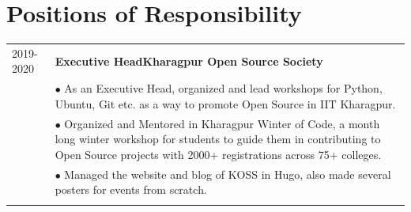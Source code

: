 \documentclass[a4paper,12pt]{extarticle} %
\let\oldtextbf\textbf
\renewcommand{\textbf}[1]{\textcolor{bold}{\oldtextbf{#1}}}
\begin{document}
\vspace{0.5cm}
\section{\textcolor{primary}{Positions of Responsibility}}
\begin{tabularx}{\linewidth}{ l | X }

  \textsc{2019-2020}
   & \textbf{Executive Head}\hfill\textbf{Kharagpur Open Source Society}                                                                                   \\
   & {$\bullet$ As an Executive Head, organized and lead workshops for Python, Ubuntu, Git etc. as a way to promote Open Source in IIT Kharagpur.}         \\

   & {$\bullet$ Organized and Mentored in Kharagpur Winter of Code, a month long winter workshop for students to guide them in contributing to Open Source
      projects with 2000+ registrations across 75+ colleges.
    }                                                                                                                                                      \\
   & {$\bullet$ Managed the website and blog of KOSS in Hugo, also made several posters for events from scratch.}                                          \\

  \multicolumn{2}{c}{}                                                                                                                                     \\
\end{tabularx}


\end{document}
